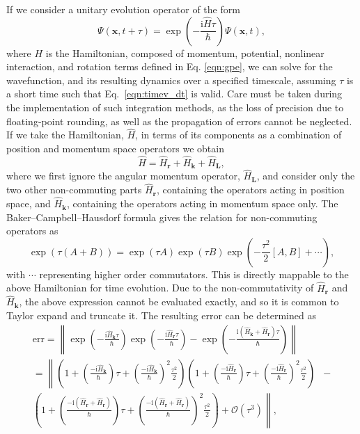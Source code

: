 If we consider a unitary evolution operator of the form
\begin{equation}\label{eqn:1}
\Psi(\mathbf{x},t+\tau) = \exp\left( -\frac{\text{i}\hat{H}\tau}{\hbar}\right)\Psi(\mathbf{x},t),
\end{equation}
where $H$ is the Hamiltonian, composed of momentum, potential, nonlinear interaction, and rotation terms defined in Eq. \eqref{eqn:gpe}, we can solve for the wavefunction, and its resulting dynamics over a specified timescale, assuming $\tau$ is a short time such that Eq.~\eqref{eqn:timev_dt} is valid. Care must be taken during the implementation of such integration methods, as the loss of precision due to floating-point rounding, as well as the propagation of errors cannot be neglected. If we take the Hamiltonian, $\hat{H}$, in terms of its components as a combination of position and momentum space operators we obtain
\begin{equation}\label{eqn:2}
\hat{H} = \hat{H}_{\textbf{r}} + \hat{H}_{\textbf{k}} + \hat{H}_{\textbf{L}},
\end{equation}
where we first ignore the angular momentum operator, $\hat{H}_{\textbf{L}}$, and consider only the two other non-commuting parts $\hat{H}_{\textbf{r}}$, containing the operators acting in position space, and $\hat{H}_{\textbf{k}}$, containing the operators acting in momentum space only. The Baker--Campbell--Hausdorf formula \cite{NUM:Weyrauch_cpc_2009} gives the relation for non-commuting operators as
\begin{equation}
    \exp\left( \tau(A+B) \right) = \exp\left(\tau A\right)\exp\left(\tau B\right)\exp\left(-\frac{\tau^2}{2}[A,B] + \cdots\right),
\end{equation}
with $\cdots$ representing higher order commutators. This is directly mappable to the above Hamiltonian for time evolution. Due to the non-commutativity of $\hat{H}_{\textbf{r}}$ and $\hat{H}_{\textbf{k}}$, the above expression cannot be evaluated exactly, and so it is common to Taylor expand and truncate it. The resulting error can be determined as
\begin{subequations}\label{eqn:error_calc}
\begin{align}
    \text{err} = \left\| \exp\left(-\frac{\textrm{i}\hat{H}_{\textbf{k}}\tau}{\hbar}\right)\exp\left(-\frac{\textrm{i}\hat{H}_{\textbf{r}}\tau}{\hbar}\right) - \exp\left(-\frac{\textrm{i}(\hat{H}_{\textbf{k}} + \hat{H}_{\textbf{r}})\tau}{\hbar}\right) \right\| \\
    = \left\|  \left(1 + \left(\frac{-\textrm{i}\hat{H}_{\textbf{k}}}{\hbar}\right)\tau + \left(\frac{-\textrm{i}\hat{H}_{\textbf{k}}}{\hbar}\right)^2\frac{\tau^2}{2}  \right)\left(1 + \left(\frac{-\textrm{i}\hat{H}_{\textbf{r}}}{\hbar}\right)\tau + \left(\frac{-\textrm{i}\hat{H}_{\textbf{r}}}{\hbar}\right)^2\frac{\tau^2}{2}  \right) \right. &- \nonumber \\ \left. \left(1 + \left(\frac{-\textrm{i}(\hat{H}_{\textbf{r}} + \hat{H}_{\textbf{r}})}{\hbar}\right)\tau + \left(\frac{-\textrm{i}(\hat{H}_{\textbf{r}} + \hat{H}_{\textbf{r}})}{\hbar}\right)^2\frac{\tau^2}{2}  \right)  + \mathcal{O}(\tau^3) \right\|,
\end{align}
\end{subequations}
